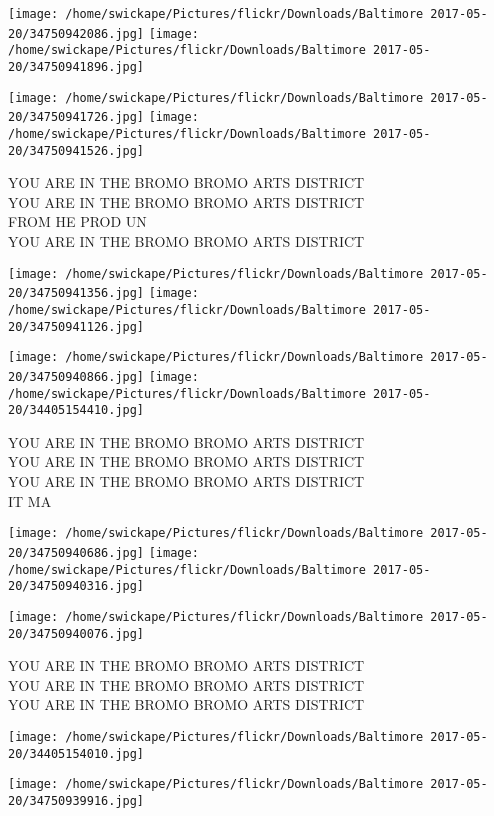 \documentclass[10pt,letterpaper]{article}
\begin{document}
\texttt{[image: /home/swickape/Pictures/flickr/Downloads/Baltimore 2017-05-20/34750942086.jpg]}
\texttt{[image: /home/swickape/Pictures/flickr/Downloads/Baltimore 2017-05-20/34750941896.jpg]}

\texttt{[image: /home/swickape/Pictures/flickr/Downloads/Baltimore 2017-05-20/34750941726.jpg]}
\texttt{[image: /home/swickape/Pictures/flickr/Downloads/Baltimore 2017-05-20/34750941526.jpg]}

YOU ARE IN THE BROMO BROMO ARTS DISTRICT\\
YOU ARE IN THE BROMO BROMO ARTS DISTRICT\\
FROM HE PROD UN\\
YOU ARE IN THE BROMO BROMO ARTS DISTRICT
\pagebreak

\texttt{[image: /home/swickape/Pictures/flickr/Downloads/Baltimore 2017-05-20/34750941356.jpg]}
\texttt{[image: /home/swickape/Pictures/flickr/Downloads/Baltimore 2017-05-20/34750941126.jpg]}

\texttt{[image: /home/swickape/Pictures/flickr/Downloads/Baltimore 2017-05-20/34750940866.jpg]}
\texttt{[image: /home/swickape/Pictures/flickr/Downloads/Baltimore 2017-05-20/34405154410.jpg]}

YOU ARE IN THE BROMO BROMO ARTS DISTRICT\\
YOU ARE IN THE BROMO BROMO ARTS DISTRICT\\
YOU ARE IN THE BROMO BROMO ARTS DISTRICT\\
IT MA
\pagebreak

\texttt{[image: /home/swickape/Pictures/flickr/Downloads/Baltimore 2017-05-20/34750940686.jpg]}
\texttt{[image: /home/swickape/Pictures/flickr/Downloads/Baltimore 2017-05-20/34750940316.jpg]}

\texttt{[image: /home/swickape/Pictures/flickr/Downloads/Baltimore 2017-05-20/34750940076.jpg]}

YOU ARE IN THE BROMO BROMO ARTS DISTRICT\\
YOU ARE IN THE BROMO BROMO ARTS DISTRICT\\
YOU ARE IN THE BROMO BROMO ARTS DISTRICT
\pagebreak

\texttt{[image: /home/swickape/Pictures/flickr/Downloads/Baltimore 2017-05-20/34405154010.jpg]}

\vspace{0.25in}
\texttt{[image: /home/swickape/Pictures/flickr/Downloads/Baltimore 2017-05-20/34750939916.jpg]}
\end{document}
